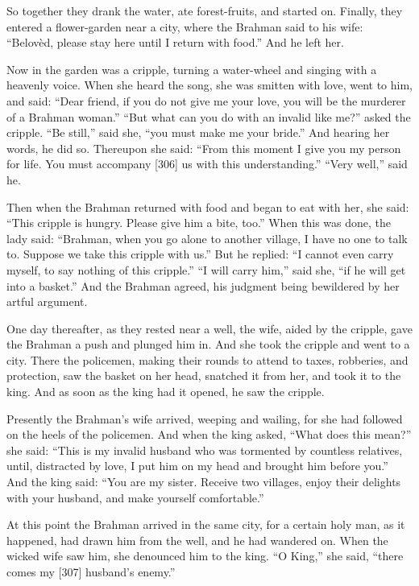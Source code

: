 \documentclass[article, twoside, 14pt]{memoir}
\begin{document}
So together they drank the water, ate forest-fruits, and started
on. Finally, they entered a flower-garden near a city, where the
Brahman said to his wife:
``Belovèd, please stay here until I return with food.'' And he left
her.

Now in the garden was a cripple, turning a water-wheel and singing
with a heavenly voice. When she heard the song, she was smitten
with love, went to him, and said:
``Dear friend, if you do not give me your love, you will be the murderer of a Brahman woman.''
``But what can you do with an invalid like me?'' asked the cripple.
``Be still,'' said she, ``you must make me your bride.'' And
hearing her words, he did so. Thereupon she said:
``From this moment I give you my person for life. You must accompany [306] us with this understanding.''
``Very well,'' said he.

Then when the Brahman returned with food and began to eat with her,
she said: ``This cripple is hungry. Please give him a bite, too.''
When this was done, the lady said:
``Brahman, when you go alone to another village, I have no one to talk to. Suppose we take this cripple with us.''
But he replied:
``I cannot even carry myself, to say nothing of this cripple.''
``I will carry him,'' said she, ``if he will get into a basket.''
And the Brahman agreed, his judgment being bewildered by her artful
argument.

One day thereafter, as they rested near a well, the wife, aided by
the cripple, gave the Brahman a push and plunged him in. And she
took the cripple and went to a city. There the policemen, making
their rounds to attend to taxes, robberies, and protection, saw the
basket on her head, snatched it from her, and took it to the king.
And as soon as the king had it opened, he saw the cripple.

Presently the Brahman's wife arrived, weeping and wailing, for she
had followed on the heels of the policemen. And when the king
asked, ``What does this mean?'' she said:
``This is my invalid husband who was tormented by countless relatives, until, distracted by love, I put him on my head and brought him before you.''
And the king said:
``You are my sister. Receive two villages, enjoy their delights with your husband, and make yourself comfortable.''

At this point the Brahman arrived in the same city, for a certain
holy man, as it happened, had drawn him from the well, and he had
wandered on. When the wicked wife saw him, she denounced him to the
king. ``O King,'' she said,
``there comes my [307] husband's enemy.''
\end{document}
